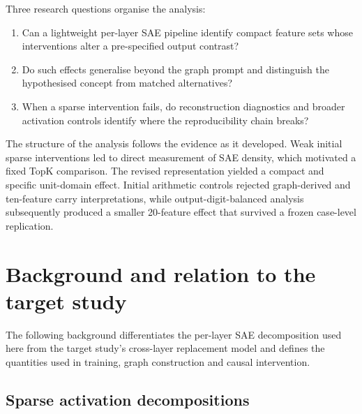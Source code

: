 \documentclass[11pt,a4paper]{article}
\begin{document}
    Three research questions organise the analysis:

    \begin{enumerate}
        \item Can a lightweight per-layer SAE pipeline identify compact feature sets whose interventions alter a pre-specified output contrast?
        \item Do such effects generalise beyond the graph prompt and distinguish the hypothesised concept from matched alternatives?
        \item When a sparse intervention fails, do reconstruction diagnostics and broader activation controls identify where the reproducibility chain     breaks?
    \end{enumerate}

    The structure of the analysis follows the evidence as it developed. Weak initial sparse interventions led to direct measurement of SAE density, which motivated a fixed TopK comparison. The revised representation yielded a compact and specific unit-domain effect. Initial arithmetic controls rejected graph-derived and ten-feature carry interpretations, while output-digit-balanced analysis subsequently produced a smaller 20-feature effect that survived a frozen case-level replication.

\section{Background and relation to the target study}

    The following background differentiates the per-layer SAE decomposition used here from the target study's cross-layer replacement model and defines the quantities used in training, graph construction and causal intervention.

\subsection{Sparse activation decompositions}
\end{document}
